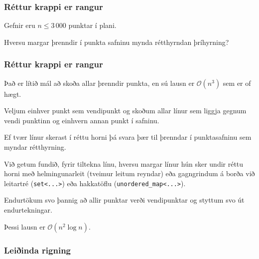 {
	\frametitle{Réttur krappi er rangur}
	{
		\item<1-> Gefnir eru $n \leq 3\, 000$ punktar í plani.
		\item<2-> Hversu margar þrenndir í punkta safninu mynda rétthyrndan þríhyrning?
	}
}

{
	\frametitle{Réttur krappi er rangur}
	{
		\item<1-> Það er lítið mál að skoða allar þrenndir punkta, en sú lausn er $\mathcal{O}(n^3)$ sem er of hægt.
		\item<2-> Veljum einhver punkt sem vendipunkt og skoðum allar línur sem liggja gegnum vendi punktinn og einhvern annan punkt í safninu.
		\item<3-> Ef tvær línur skerast í réttu horni þá svara þær til þrenndar í punktasafninu sem myndar rétthyrning.
		\item<4-> Við getum fundið, fyrir tiltekna línu, hversu margar línur hún sker undir réttu horni með helmingunarleit (tveimur leitum reyndar)
					eða gagngrindum á borða við leitartré (\texttt{set<...>}) eða hakkatöflu (\texttt{unordered\_map<...>}).
		\item<5-> Endurtökum svo þannig að allir punktar verði vendipunktar og styttum svo út endurtekningar.
		\item<6-> Þessi lausn er $\mathcal{O}(n^2 \log n)$.
	}
}

{
	\frametitle{Leiðinda rigning}
	{
		\item<1-> 
	}
}

{
}


